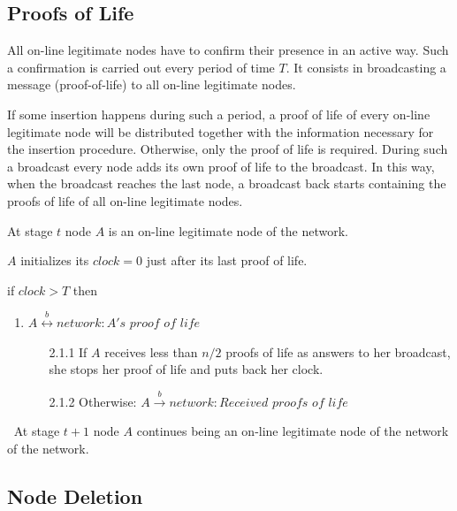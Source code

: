 \documentclass[conference]{IEEEtran}
\begin{document}
\subsection{Proofs of Life}

All on-line legitimate nodes have to confirm their presence in an active way. Such a confirmation is carried out every period of time $T$. It consists in broadcasting a message (proof-of-life) to all on-line legitimate nodes.

If some insertion happens during such a period, a proof of life of every on-line legitimate node will be distributed together with the information necessary for the insertion procedure. Otherwise, only the proof of life is required. During such a broadcast every node adds its own proof of life to the broadcast. In this way, when the broadcast reaches the last node, a broadcast back starts containing the proofs of life of all on-line legitimate nodes.

\begin{description} 


\item [Input:] At stage $t$ node $A$ is an on-line legitimate node of the
network.
\item [1.] $A$ initializes its $clock=0$ just after its last proof of
    life.
    \item [2.] if $clock > T$ then
    \begin{enumerate}
        [2.1]\item $ A \stackrel{b}{\leftrightarrow} network: A's$ $ proof$ $of$ $life$
     \begin {itemize}
     \item [2.1.1] If $A$ receives less than $n/2$ proofs of life as answers to her broadcast, she stops her proof of life and puts back her clock.
      \item [2.1.2] Otherwise: $ A \stackrel{b}{\rightarrow} network: Received$ $proofs$ $of$ $life$
\end {itemize}
    \end{enumerate}


    \item [Output:] $\ $ At stage $t+1$ node $A$ continues being an on-line
legitimate node of the network of the network.
\end{description}


\subsection{Node Deletion}
\end{document}

